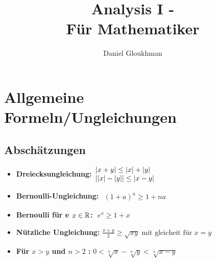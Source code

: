 \documentclass[german]{latex4ei/latex4ei_sheet}
\title{Analysis I -\\ Für Mathematiker}
\author{Daniel Gloukhman}					%
\begin{document}
\maketitle   %


\section{Allgemeine Formeln/Ungleichungen}

\begin{sectionbox}
	\subsection{Abschätzungen}
	\begin{itemize}
		\item \textbf{Dreiecksungleichung:}\begin{math}\begin{array}{l}
	\left\vert x + y\right\vert \le \left\vert x\right\vert + \left\vert y\right\vert \\
	\left\vert\left\vert x\right\vert- \left\vert y\right\vert\right\vert \le \left\vert x-y\right\vert 
\end{array}\end{math}

   		\item \textbf{Bernoulli-Ungleichung:} \begin{math}\begin{array}{l}
	(1+a)^n \ge 1 + na
\end{array}\end{math} 

		\item \textbf{Bernoulli für e  $x \in \operatorname{\mathbb R}$:}\qquad $\text{  }e^x  \ge 1+x $
		\item \textbf{Nützliche Ungleichung: }$\frac{x+y}{2}\ge\sqrt{xy}\text{ mit gleicheit für }x=y$  
		\item \textbf{Für $x>y$ und $n>2$ : }$0<\sqrt[n]{x}-\sqrt[n]{y}<\sqrt[n]{x-y}$

	\end{itemize}

\end{sectionbox}
\end{document}
